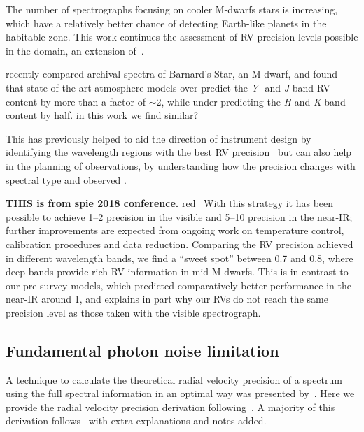 
The number of \nir{} spectrographs focusing on cooler {M-dwarfs} stars is increasing, which have a relatively better chance of detecting Earth-like planets in the habitable zone.
This work continues the assessment of {RV} precision levels possible in the \nir{} domain, an extension of~\citep{figueira_radial_2016}.



\citet{artigau_optical_2018} recently compared archival spectra of Barnard's Star, an {M-dwarf}, and found that state-of-the-art atmosphere models over-predict the \emph{Y}- and \emph{J}-band {RV} content by more than a factor of \(\sim2\), while under-predicting the \emph{H} and \emph{K}-band content by half.
{\red{} in this work we find similar?}

This has previously helped to aid the direction of instrument design by identifying the wavelength regions with the best {RV} precision~\citep{figueira_radial_2016} but can also help in the planning of observations, by understanding how the precision changes with spectral type and observed {\snr{}}.


\textbf{THIS is from spie 2018 conference.}
{red{}~\citep{quirrenbach_carmenes_2018} With this strategy it has been possible to achieve 1--2\mps{} precision in the visible and 5--10\mps{} precision in the {near-IR}; further improvements are expected from ongoing work on temperature control, calibration procedures and data reduction.
Comparing the {RV} precision achieved in different wavelength bands, we find a ``sweet spot'' between 0.7 and 0.8\um{}, where deep  bands provide rich {RV} information in mid-M dwarfs.
This is in contrast to our pre-survey models, which predicted comparatively better performance in the near-IR around 1\um{}, and explains in part why our \nir{} {RV}s do not reach the same precision level as those taken with the visible spectrograph.}




\subsection{Fundamental photon noise limitation}
\label{subsec:fundamental_precision}
A technique to calculate the theoretical radial velocity precision of a spectrum using the full spectral information in an optimal way was presented by~\citet{connes_absolute_1985}.
Here we provide the radial velocity precision derivation following~\citet{connes_absolute_1985, bouchy_fundamental_2001, figueira_radial_2016}.
A majority of this derivation follows~\citet{bouchy_fundamental_2001} with extra explanations and notes added.

